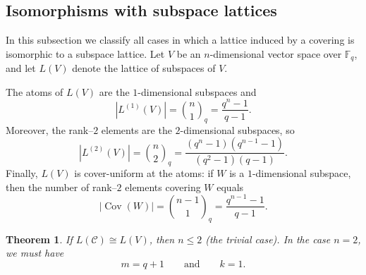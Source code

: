\documentclass{article}
\newtheorem{theorem}{Theorem}[section]
\begin{document}
\subsection{Isomorphisms with subspace lattices}

In this subsection we classify all cases in which a lattice induced by a covering is isomorphic to a subspace lattice.
Let \(V\) be an \(n\)-dimensional vector space over \(\mathbb{F}_q\), and let \(L(V)\) denote the lattice of subspaces of \(V\).

The atoms of $L(V)$ are the \(1\)-dimensional subspaces and
\begin{equation}\label{eq:LV_atoms}
|L^{(1)}(V)|=\binom{n}{1}_q=\frac{q^n-1}{q-1}.
\end{equation}
Moreover, the rank--\(2\) elements are the \(2\)-dimensional subspaces, so
\begin{equation}\label{eq:LV_rank2}
|L^{(2)}(V)|=\binom{n}{2}_q
=\frac{(q^n-1)(q^{n-1}-1)}{(q^2-1)(q-1)}.
\end{equation}
Finally, \(L(V)\) is cover-uniform at the atoms: if \(W\) is a \(1\)-dimensional subspace, then the number of rank--\(2\) elements covering \(W\) equals
\begin{equation}\label{eq:LV_cov}
|\operatorname{Cov}(W)|=\binom{n-1}{1}_q=\frac{q^{n-1}-1}{q-1}.
\end{equation}

\begin{theorem}\label{thm:LV-necessary}
If \(L(\mathcal C)\cong L(V)\), then \(n\leq 2\) (the trivial case).
In the case \(n=2\), we must have
\[
m=q+1
\qquad\text{and}\qquad
k=1.
\]
\end{theorem}
\end{document}
